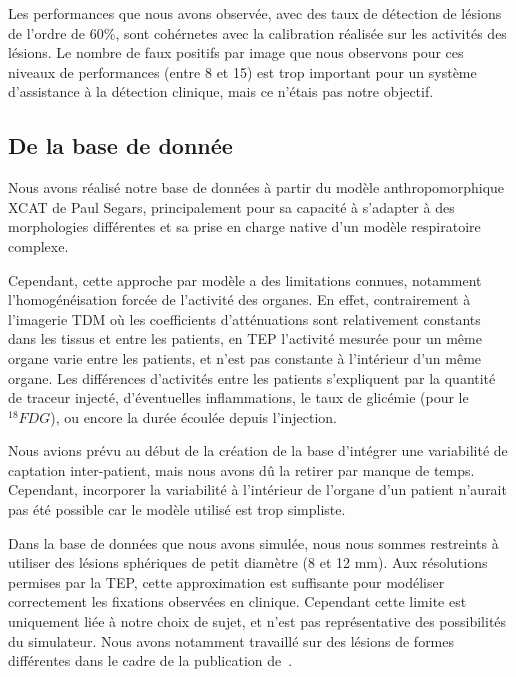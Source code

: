Les performances que nous avons observée, avec des taux de détection de lésions
de l'ordre de 60\%, sont cohérnetes avec la calibration réalisée sur les
activités des lésions. Le nombre de faux positifs par image que nous observons
pour ces niveaux de performances (entre 8 et 15) est trop important pour un
système d'assistance à la détection clinique, mais ce n'étais pas notre
objectif.
 

\subsection{De la base de donnée}

Nous avons réalisé notre base de données à partir du modèle anthropomorphique
XCAT de Paul Segars, principalement pour sa capacité à s'adapter à des
morphologies différentes et sa prise en charge native d'un modèle respiratoire
complexe. 

Cependant, cette approche par modèle a des limitations connues, notamment
l'homogénéisation forcée de l'activité des organes. En effet, contrairement à
l'imagerie TDM où les coefficients d'atténuations sont relativement constants
dans les tissus et entre les patients, en TEP l'activité mesurée pour un même
organe varie entre les patients, et n'est pas constante à l'intérieur d'un même
organe. Les différences d'activités entre les patients s'expliquent par la
quantité de traceur injecté, d'éventuelles inflammations, le taux de glicémie
(pour le $^{18}FDG$), ou encore la durée écoulée depuis l'injection.  

Nous avions prévu au début de la création de la base d'intégrer une variabilité
de captation inter-patient, mais nous avons dû la retirer par manque de temps.
Cependant, incorporer la variabilité à l'intérieur de l'organe d'un patient
n'aurait pas été possible car le modèle utilisé est trop simpliste.  

Dans la base de données que nous avons simulée, nous nous sommes restreints à
utiliser des lésions sphériques de petit diamètre (8 et 12 mm). Aux résolutions
permises par la TEP, cette approximation est suffisante pour modéliser
correctement les fixations observées en clinique. Cependant cette limite est
uniquement liée à notre choix de sujet, et n'est pas représentative des
possibilités du simulateur. Nous avons notamment travaillé sur des lésions de
formes différentes dans le cadre de la publication
de~\cite{le2009incorporating}.  


